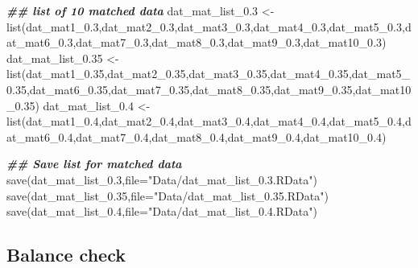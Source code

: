 \documentclass[
]{book}
\newenvironment{Shaded}{\begin{snugshade}}{\end{snugshade}}
\newcommand{\AttributeTok}[1]{\textcolor[rgb]{0.77,0.63,0.00}{#1}}
\newcommand{\DocumentationTok}[1]{\textcolor[rgb]{0.56,0.35,0.01}{\textbf{\textit{#1}}}}
\newcommand{\FloatTok}[1]{\textcolor[rgb]{0.00,0.00,0.81}{#1}}
\newcommand{\FunctionTok}[1]{\textcolor[rgb]{0.00,0.00,0.00}{#1}}
\newcommand{\NormalTok}[1]{#1}
\newcommand{\OtherTok}[1]{\textcolor[rgb]{0.56,0.35,0.01}{#1}}
\newcommand{\StringTok}[1]{\textcolor[rgb]{0.31,0.60,0.02}{#1}}
\begin{document}
\begin{Shaded}
\begin{Highlighting}[]
\DocumentationTok{\#\# list of 10 matched data }
\NormalTok{dat\_mat\_list\_0}\FloatTok{.3} \OtherTok{\textless{}{-}} \FunctionTok{list}\NormalTok{(dat\_mat1\_0}\FloatTok{.3}\NormalTok{,dat\_mat2\_0}\FloatTok{.3}\NormalTok{,dat\_mat3\_0}\FloatTok{.3}\NormalTok{,dat\_mat4\_0}\FloatTok{.3}\NormalTok{,dat\_mat5\_0}\FloatTok{.3}\NormalTok{,dat\_mat6\_0}\FloatTok{.3}\NormalTok{,dat\_mat7\_0}\FloatTok{.3}\NormalTok{,dat\_mat8\_0}\FloatTok{.3}\NormalTok{,dat\_mat9\_0}\FloatTok{.3}\NormalTok{,dat\_mat10\_0}\FloatTok{.3}\NormalTok{)}
\NormalTok{dat\_mat\_list\_0}\FloatTok{.35} \OtherTok{\textless{}{-}} \FunctionTok{list}\NormalTok{(dat\_mat1\_0}\FloatTok{.35}\NormalTok{,dat\_mat2\_0}\FloatTok{.35}\NormalTok{,dat\_mat3\_0}\FloatTok{.35}\NormalTok{,dat\_mat4\_0}\FloatTok{.35}\NormalTok{,dat\_mat5\_0}\FloatTok{.35}\NormalTok{,dat\_mat6\_0}\FloatTok{.35}\NormalTok{,dat\_mat7\_0}\FloatTok{.35}\NormalTok{,dat\_mat8\_0}\FloatTok{.35}\NormalTok{,dat\_mat9\_0}\FloatTok{.35}\NormalTok{,dat\_mat10\_0}\FloatTok{.35}\NormalTok{)}
\NormalTok{dat\_mat\_list\_0}\FloatTok{.4} \OtherTok{\textless{}{-}} \FunctionTok{list}\NormalTok{(dat\_mat1\_0}\FloatTok{.4}\NormalTok{,dat\_mat2\_0}\FloatTok{.4}\NormalTok{,dat\_mat3\_0}\FloatTok{.4}\NormalTok{,dat\_mat4\_0}\FloatTok{.4}\NormalTok{,dat\_mat5\_0}\FloatTok{.4}\NormalTok{,dat\_mat6\_0}\FloatTok{.4}\NormalTok{,dat\_mat7\_0}\FloatTok{.4}\NormalTok{,dat\_mat8\_0}\FloatTok{.4}\NormalTok{,dat\_mat9\_0}\FloatTok{.4}\NormalTok{,dat\_mat10\_0}\FloatTok{.4}\NormalTok{)}

\DocumentationTok{\#\# Save list for matched data}
\FunctionTok{save}\NormalTok{(dat\_mat\_list\_0}\FloatTok{.3}\NormalTok{,}\AttributeTok{file=}\StringTok{"Data/dat\_mat\_list\_0.3.RData"}\NormalTok{)}
\FunctionTok{save}\NormalTok{(dat\_mat\_list\_0}\FloatTok{.35}\NormalTok{,}\AttributeTok{file=}\StringTok{"Data/dat\_mat\_list\_0.35.RData"}\NormalTok{)}
\FunctionTok{save}\NormalTok{(dat\_mat\_list\_0}\FloatTok{.4}\NormalTok{,}\AttributeTok{file=}\StringTok{"Data/dat\_mat\_list\_0.4.RData"}\NormalTok{)}
\end{Highlighting}
\end{Shaded}

\hypertarget{balance-check-1}{%
\subsection{Balance check}\label{balance-check-1}}
\end{document}
